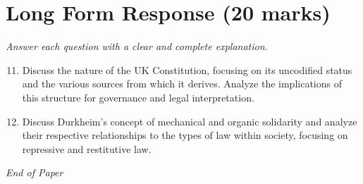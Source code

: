 \documentclass[12pt]{article}
\begin{document}
\section*{Long Form Response (20 marks)}
\textit{Answer each question with a clear and complete explanation.}
\begin{enumerate}[label=\arabic*.]
\setcounter{enumi}{10}
\item Discuss the nature of the UK Constitution, focusing on its uncodified status and the various sources from which it derives. Analyze the implications of this structure for governance and legal interpretation.
\item Discuss Durkheim's concept of mechanical and organic solidarity and analyze their respective relationships to the types of law within society, focusing on repressive and restitutive law.
\end{enumerate}

\vfill
\noindent\textit{End of Paper}
\end{document}
